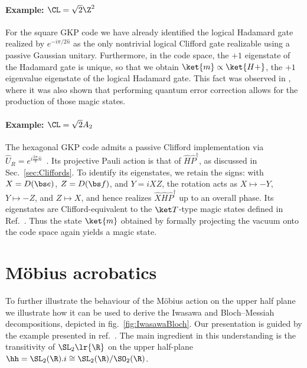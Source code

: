 \documentclass[a4paper, aps, pra, 11pt, onecolumn, tightenlines, superscriptaddress]{revtex4-2}
\begin{document}
\medskip
\paragraph*{Example: $\CL=\sqrt{2}\Z^2$}
For the square GKP code we have already identified the logical Hadamard gate realized by $e^{-i\pi/2 \hat{n}}$ as the only nontrivial logical Clifford gate realizable using a passive Gaussian unitary.
Furthermore, in the code space, the $+1$ eigenstate of the Hadamard gate is unique, so that we obtain $\ket{m}\propto\ket{H+}$, the $+1$ eigenvalue eigenstate of the logical Hadamard gate.
This fact was observed in \cite{AllGaussian}, where it was also shown that performing quantum error correction allows for the production of those magic states.
\medskip
\paragraph*{Example: $\CL=\sqrt{2}A_2$}
The hexagonal GKP code admits a passive Clifford implementation via $\hat U_R=e^{i\frac{2\pi}{3}\hat n}$~\cite{GCB}. Its projective Pauli action is that of $\hat H\hat P^{\dagger}$, as discussed in Sec.~\ref{sec:Cliffords}. To identify its eigenstates, we retain the signs: with $X=D(\bs e)$, $Z=D(\bs f)$, and $Y=iXZ$, the rotation acts as $X\mapsto -Y$, $Y\mapsto -Z$, and $Z\mapsto X$, and hence realizes $\hat X\hat H\hat P^{\dagger}$ up to an overall phase. Its eigenstates are Clifford-equivalent to the $\ket T$-type magic states defined in Ref.~\cite{Bravyi_2005}. Thus the state $\ket{m}$ obtained by formally projecting the vacuum onto the code space again yields a magic state.
\medskip

\section{Möbius acrobatics}\label{App:Moebius}

To further illustrate the behaviour of the Möbius action on the upper half plane we illustrate how it can be used to derive the Iwasawa and Bloch--Messiah decompositions, depicted in fig.~\ref{fig:IwasawaBloch}. Our presentation is guided by the example presented in ref.~\cite{Conrad_lectures}. The main ingredient in this understanding is the transitivity of $\SL_2\lr{\R}$ on the upper half-plane $\hh=\SL_2(\R).i\cong\SL_2(\R)/\SO_2(\R)$.
\end{document}
